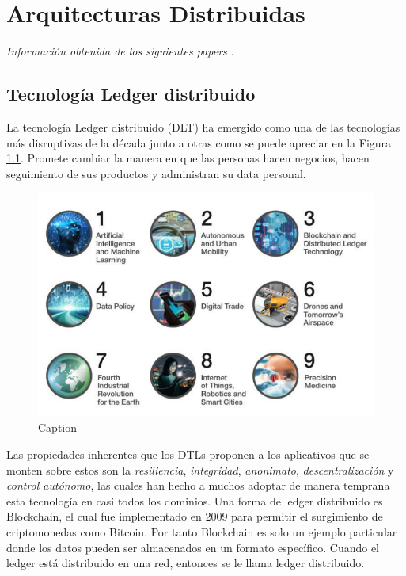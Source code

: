 \chapter{Arquitecturas Distribuidas}
\vspace{60px}
\begin{flushright}
\textit{Información obtenida de los siguientes papers \cite{DLT2019}}.
\end{flushright}

\section{Tecnología Ledger distribuido }
La tecnología Ledger distribuido (DLT) ha emergido como una de las tecnologías más disruptivas de la década junto a otras como se puede apreciar en la Figura \ref{fig:tecdisr}. Promete cambiar la manera en que las personas hacen negocios, hacen seguimiento de sus productos y administran su data personal.
\begin{figure}
    \centering
    \includegraphics[scale=0.5]{Pictures/tecnologiasdisruptivas.png}
    \caption{Caption}
    \label{fig:tecdisr}
\end{figure}
Las propiedades inherentes que los DTLs proponen a los aplicativos que se monten sobre estos son la \textit{resiliencia},  \textit{integridad}, \textit{anonimato}, \textit{descentralización} y \textit{control autónomo}, las cuales han hecho a muchos adoptar de manera temprana esta tecnología en casi todos los dominios. 
Una forma de ledger distribuido es Blockchain, el cual fue implementado en 2009 para permitir el surgimiento de criptomonedas como Bitcoin. 
Por tanto Blockchain es solo un ejemplo particular donde los datos pueden ser almacenados en un formato específico. Cuando el ledger está distribuido en una red, entonces se le llama ledger distribuido.

